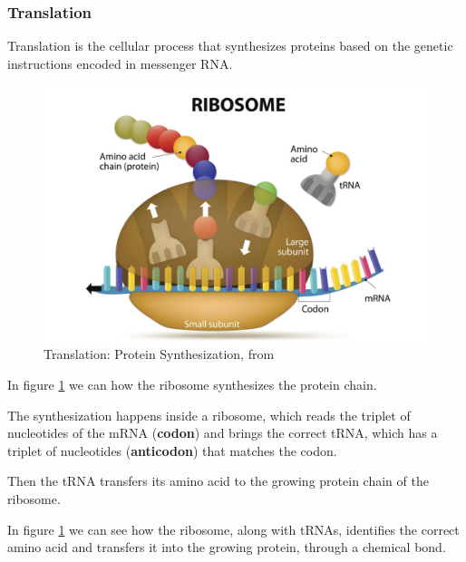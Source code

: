\subsubsection{Translation}

Translation is the cellular process that synthesizes proteins based on the genetic instructions encoded in messenger RNA.

\begin{figure}[h!]
	\includegraphics[scale=.3]{res/proteins_overview/ribosome.png}
	\centering
	\caption{Translation: Protein Synthesization, from \cite{translation}}
	\label{fig:protein-synth}
\end{figure}

In figure \ref{fig:protein-synth} we can how the ribosome synthesizes the protein chain.

The synthesization happens inside a ribosome, which reads the triplet of nucleotides of the mRNA (\textbf{codon}) and brings the correct tRNA, which has a triplet of nucleotides (\textbf{anticodon}) that matches the codon.

Then the tRNA transfers its amino acid to the growing protein chain of the ribosome.

In figure \ref{fig:protein-synth} we can see how the ribosome, along with tRNAs, identifies the correct amino acid and transfers it into the growing protein, through a chemical bond.

